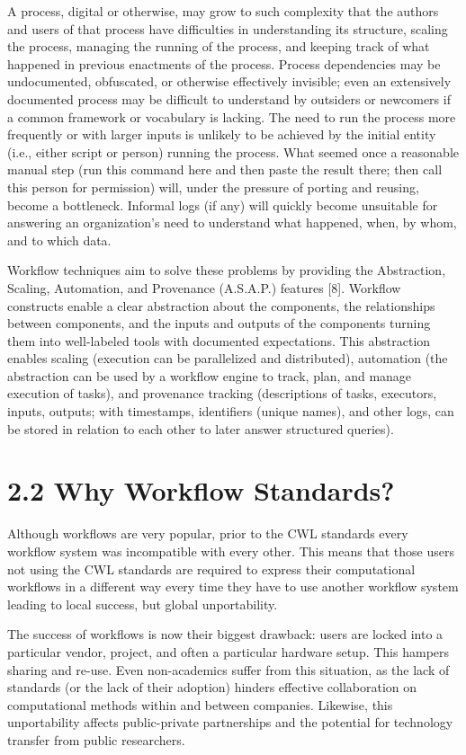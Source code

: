 \documentclass[
]{article}
\begin{document}
A process, digital or otherwise, may grow to such complexity that the
authors and users of that process have difficulties in understanding its
structure, scaling the process, managing the running of the process, and
keeping track of what happened in previous enactments of the process.
Process dependencies may be undocumented, obfuscated, or otherwise
effectively invisible; even an extensively documented process may be
difficult to understand by outsiders or newcomers if a common framework
or vocabulary is lacking. The need to run the process more frequently or
with larger inputs is unlikely to be achieved by the initial entity
(i.e., either script or person) running the process. What seemed once a
reasonable manual step (run this command here and then paste the result
there; then call this person for permission) will, under the pressure of
porting and reusing, become a bottleneck. Informal logs (if any) will
quickly become unsuitable for answering an organization's need to
understand what happened, when, by whom, and to which data.

Workflow techniques aim to solve these problems by providing the
Abstraction, Scaling, Automation, and Provenance (A.S.A.P.) features
{[}8{]}. Workflow constructs enable a clear abstraction about the
components, the relationships between components, and the inputs and
outputs of the components turning them into well-labeled tools with
documented expectations. This abstraction enables scaling (execution can
be parallelized and distributed), automation (the abstraction can be
used by a workflow engine to track, plan, and manage execution of
tasks), and provenance tracking (descriptions of tasks, executors,
inputs, outputs; with timestamps, identifiers (unique names), and other
logs, can be stored in relation to each other to later answer structured
queries).

\section{2.2 Why Workflow Standards?}\label{why-workflow-standards}

Although workflows are very popular, prior to the CWL standards every
workflow system was incompatible with every other. This means that those
users not using the CWL standards are required to express their
computational workflows in a different way every time they have to use
another workflow system leading to local success, but global
unportability.

The success of workflows is now their biggest drawback: users are locked
into a particular vendor, project, and often a particular hardware
setup. This hampers sharing and re-use. Even non-academics suffer from
this situation, as the lack of standards (or the lack of their adoption)
hinders effective collaboration on computational methods within and
between companies. Likewise, this unportability affects public-private
partnerships and the potential for technology transfer from public
researchers.
\end{document}
